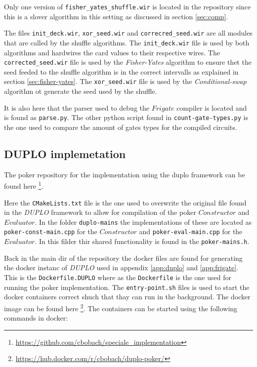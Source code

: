 \documentclass[twoside,11pt,openright]{report}
\newcommand{\FY}{\textit{Fisher-Yates} }
\newcommand{\CS}{\textit{Conditional-swap} }
\newcommand{\DUPLO}{\textit{DUPLO} }
\begin{document}
\begin{appendices}
Only one version of \verb|fisher_yates_shuffle.wir| is located in the repository since this is a slover algorithm in this setting as discussed in section \ref{sec:comp}.

The files \verb|init_deck.wir|, \verb|xor_seed.wir| and \verb|correcred_seed.wir| are all modules that are called by the shuffle algorithms. The \verb|init_deck.wir| file is used by both algorithms and hardwires the card values to their respective wires. The \verb|corrected_seed.wir| file is used by the \FY algorithm to ensure thet the seed feeded to the shuffle algorithm is in the correct intervalls as explained in section \ref{sec:fisher-yates}. The \verb|xor_seed.wir| file is used by the \CS algorithm ot generate the seed used by the shuffle.

\bigskip

It is also here that the parser used to debug the $Frigate$ compiler is located and is found as \verb|parse.py|. The other python script found in \verb|count-gate-types.py| is the one used to compare the amount of gates types for the compiled circuits.


\subsection{DUPLO implemetation}
\label{app:duplo-impl}
The poker repository for the implementation using the duplo framework can be found here \footnote{\url{https://github.com/cbobach/speciale_implementation}}.

Here the \verb|CMakeLists.txt| file is the one used to overwrite the original file found in the \DUPLO framework to allow for compilation of the poker $Constructor$ and $Evaluator$. In the folder \verb|duplo-mains| the implementations of these are located as \verb|poker-const-main.cpp| for the $Constructor$ and \verb|poker-eval-main.cpp| for the $Evaluator$. In this filder thir shared functionality is found in the \verb|poker-mains.h|.

\bigskip

Back in the main dir of the repository the docker files are found for generating the docker instanc of \DUPLO used in appendix \ref{app:duplo} and \ref{app:frigate}. This is the \verb|Dockerfile.DUPLO| where as the \verb|Dockerfile| is the one used for running the poker implementation. The \verb|entry-point.sh| files is used to start the docker containers correct shuch that thay can run in the background. The docker image can be found here \footnote{\url{https://hub.docker.com/r/cbobach/duplo-poker/}}. The containers can be started using the following commands in docker:


\end{appendices}
\end{document}
